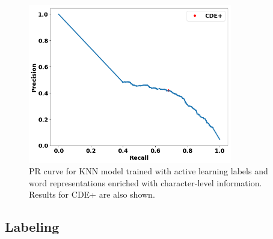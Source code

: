 \begin{figure}
\centering
\includegraphics[trim=0in 0.1in 0.1in 0.in,clip,width=3.5in]{figures/fasttext_prc_al_corpus_round5_100}
\caption{PR curve for KNN model trained with active learning labels and word representations enriched with character-level information. Results for CDE+ are also shown.
}
\label{fig:UBS_prcs_fasttext}
\end{figure}

\subsection{Labeling}\label{sec:labeling}









